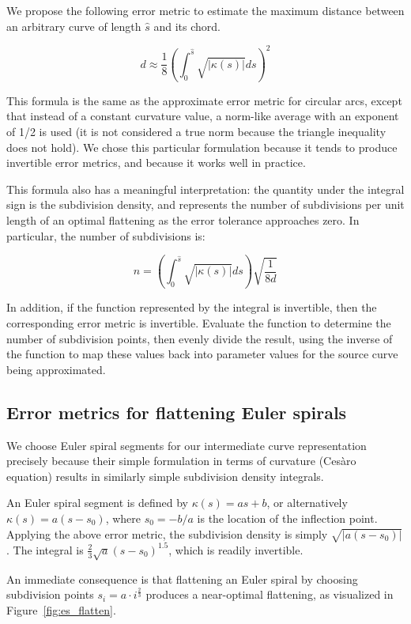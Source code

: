\documentclass[sigconf]{acmart}
\begin{document}
We propose the following error metric to estimate the maximum distance between an arbitrary curve of length $\hat{s}$ and its chord. 

\[
    d \approx \frac{1}{8}\left(\int_0^{\hat{s}} \sqrt{|\kappa(s)|}ds \right)^2
\]


This formula is the same as the approximate error metric for circular arcs, except that instead of a constant curvature value, a norm-like average with an exponent of 1/2 is used (it is not considered a true norm because the triangle inequality does not hold). We chose this particular formulation because it tends to produce invertible error metrics, and because it works well in practice.

This formula also has a meaningful interpretation: the quantity under the integral sign is the subdivision density, and represents the number of subdivisions per unit length of an optimal flattening as the error tolerance approaches zero. In particular, the number of subdivisions is:

\[
    n = \left(\int_0^{\hat{s}} \sqrt{|\kappa(s)|}ds \right)\sqrt{\frac{1}{8d}}
\]

In addition, if the function represented by the integral is invertible, then the corresponding error metric is invertible. Evaluate the function to determine the number of subdivision points, then evenly divide the result, using the inverse of the function to map these values back into parameter values for the source curve being approximated.

\subsection{Error metrics for flattening Euler spirals}

We choose Euler spiral segments for our intermediate curve representation precisely because their simple formulation in terms of curvature (Cesàro equation) results in similarly simple subdivision density integrals.

An Euler spiral segment is defined by $\kappa(s) = as+b$, or alternatively $\kappa(s) = a(s-s_0)$, where $s_0 = -b/a$ is the location of the inflection point. Applying the above error metric, the subdivision density is simply $\sqrt{|a(s-s_0)|}$. The integral is $\frac{2}{3}\sqrt{a}(s-s_0)^{1.5}$, which is readily invertible.

An immediate consequence is that flattening an Euler spiral by choosing subdivision points $s_i = a\cdot i^\frac{2}{3}$ produces a near-optimal flattening, as visualized in Figure~\ref{fig:es_flatten}.
\end{document}
